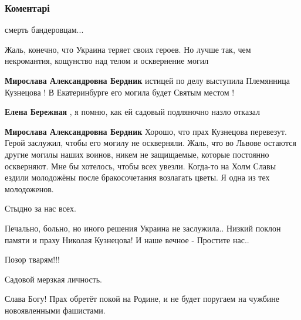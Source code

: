  
 
 
 
 
\subsubsection{Коментарі}
\label{sec:21_10_2021.fb.berezhnaja_elena.1.perezahoronenie_ostanki_kuznecov.cmt}

\begin{itemize} %
смерть бандеровцам...


Жаль, конечно, что Украина теряет своих героев. Но лучше так, чем некромантия,
кощунство над телом и осквернение могил

\begin{itemize} %
\textbf{Мирослава Александровна Бердник} истицей по делу выступила Племянница Кузнецова ! В Екатеринбурге его могила будет Святым местом !

\textbf{Елена Бережная} , я помню, как ей садовый подляночно назло отказал

\textbf{Мирослава Александровна Бердник} Хорошо, что прах Кузнецова перевезут. Герой заслужил, чтобы его могилу не оскверняли. Жаль, что во Львове остаются другие могилы наших воинов, никем не защищаемые, которые постоянно оскверняют. Мне бы хотелось, чтобы всех увезли.
Когда-то на Холм
Славы ездили молодожёны после бракосочетания возлагать цветы. Я одна из тех молодоженов.
\end{itemize} %

Стыдно за нас всех.


Печально, больно, но иного решения Украина не заслужила.. Низкий поклон памяти
и праху Николая Кузнецова! И наше вечное - Простите нас..

Позор тварям!!!

Садовой мерзкая личность.

Слава Богу! Прах обретёт покой на Родине, и не будет поругаем на чужбине новоявленными фашистами.


\end{itemize}
